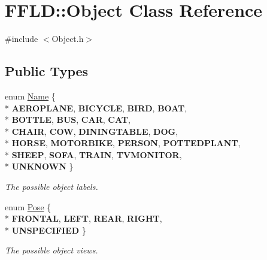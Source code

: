 \hypertarget{class_f_f_l_d_1_1_object}{\section{F\-F\-L\-D\-:\-:Object Class Reference}
\label{class_f_f_l_d_1_1_object}
}


{\ttfamily \#include $<$Object.\-h$>$}

\subsection*{Public Types}
\begin{DoxyCompactItemize}
\item 
enum \hyperlink{class_f_f_l_d_1_1_object_a4db6ef6debc5011ab6da14f251fd3a32}{Name} \{ \\*
{\bfseries A\-E\-R\-O\-P\-L\-A\-N\-E}, 
{\bfseries B\-I\-C\-Y\-C\-L\-E}, 
{\bfseries B\-I\-R\-D}, 
{\bfseries B\-O\-A\-T}, 
\\*
{\bfseries B\-O\-T\-T\-L\-E}, 
{\bfseries B\-U\-S}, 
{\bfseries C\-A\-R}, 
{\bfseries C\-A\-T}, 
\\*
{\bfseries C\-H\-A\-I\-R}, 
{\bfseries C\-O\-W}, 
{\bfseries D\-I\-N\-I\-N\-G\-T\-A\-B\-L\-E}, 
{\bfseries D\-O\-G}, 
\\*
{\bfseries H\-O\-R\-S\-E}, 
{\bfseries M\-O\-T\-O\-R\-B\-I\-K\-E}, 
{\bfseries P\-E\-R\-S\-O\-N}, 
{\bfseries P\-O\-T\-T\-E\-D\-P\-L\-A\-N\-T}, 
\\*
{\bfseries S\-H\-E\-E\-P}, 
{\bfseries S\-O\-F\-A}, 
{\bfseries T\-R\-A\-I\-N}, 
{\bfseries T\-V\-M\-O\-N\-I\-T\-O\-R}, 
\\*
{\bfseries U\-N\-K\-N\-O\-W\-N}
 \}
\begin{DoxyCompactList}\small\item\em The possible object labels. \end{DoxyCompactList}\item 
enum \hyperlink{class_f_f_l_d_1_1_object_a922b08e7fb8e69b9092b01eee82cd7ec}{Pose} \{ \\*
{\bfseries F\-R\-O\-N\-T\-A\-L}, 
{\bfseries L\-E\-F\-T}, 
{\bfseries R\-E\-A\-R}, 
{\bfseries R\-I\-G\-H\-T}, 
\\*
{\bfseries U\-N\-S\-P\-E\-C\-I\-F\-I\-E\-D}
 \}
\begin{DoxyCompactList}\small\item\em The possible object views. \end{DoxyCompactList}\end{DoxyCompactItemize}
